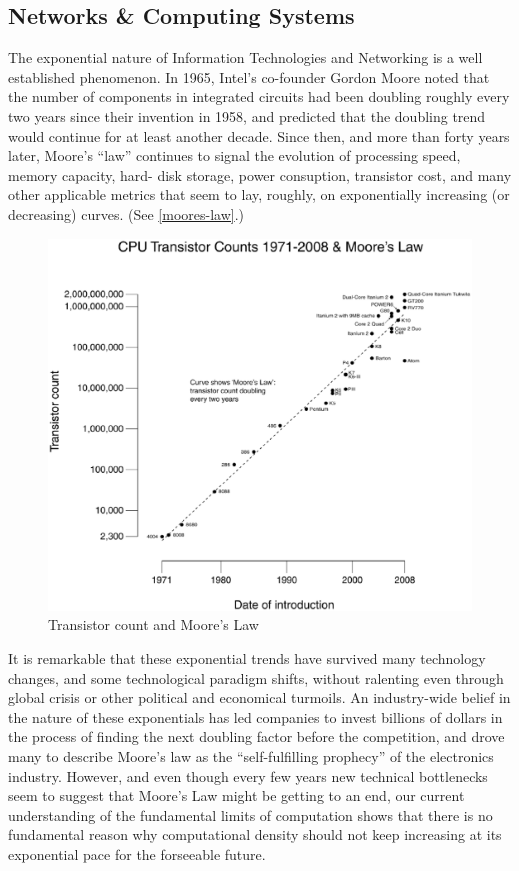\documentclass[letter,11pt]{article}
\begin{document}
\subsection{Networks \& Computing Systems}
\label{et-computing}

The exponential nature of Information Technologies and Networking is a well
established phenomenon. In 1965, Intel's co-founder Gordon Moore noted that the
number of components in integrated circuits had been doubling roughly every two
years since their invention in 1958, and predicted that the doubling trend
would continue for at least another decade. Since then, and more than forty
years later, Moore's ``law'' continues to signal the evolution of processing
speed, memory capacity, hard- disk storage, power consuption, transistor cost,
and many other applicable metrics that seem to lay, roughly, on exponentially
increasing (or decreasing) curves. (See \autoref{moores-law}.)

\begin{figure}
\includegraphics[width=\textwidth]{Transistor_Count_and_Moore's_Law_-_2008}
\caption{Transistor count and Moore's Law}
\label{moores-law}
\end{figure}

It is remarkable that these exponential trends have survived many technology
changes, and some technological paradigm shifts, without ralenting even through
global crisis or other political and economical turmoils. An industry-wide
belief in the nature of these exponentials has led companies to invest billions
of dollars in the process of finding the next doubling factor before the
competition, and drove many to describe Moore's law as  the ``self-fulfilling
prophecy'' of the electronics industry. However, and even though every few
years new technical bottlenecks seem to suggest that Moore's Law might be
getting to an end, our current understanding of the fundamental limits of
computation shows that there is no fundamental reason why computational density
should not keep increasing at its exponential pace for the forseeable future.
\end{document}
